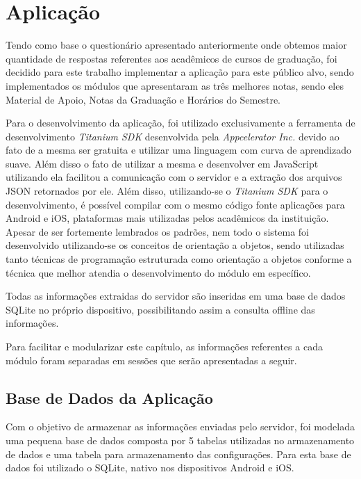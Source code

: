 \chapter{Aplicação}


Tendo como base o questionário apresentado anteriormente onde obtemos maior quantidade de respostas referentes aos acadêmicos de cursos de graduação, foi decidido para este trabalho implementar a aplicação para este público alvo, sendo implementados os módulos que apresentaram as três melhores notas, sendo eles Material de Apoio, Notas da Graduação e Horários do Semestre.

Para o desenvolvimento da aplicação, foi utilizado exclusivamente a ferramenta de desenvolvimento \emph{Titanium SDK} desenvolvida pela \emph{Appcelerator Inc.} devido ao fato de a mesma ser gratuita e utilizar uma linguagem com curva de aprendizado suave. Além disso o fato de utilizar a mesma e desenvolver em JavaScript utilizando ela facilitou a comunicação com o servidor e a extração dos arquivos JSON retornados por ele. Além disso, utilizando-se o \emph{Titanium SDK} para o desenvolvimento, é possível compilar com o mesmo código fonte aplicações para Android e iOS, plataformas mais utilizadas pelos acadêmicos da instituição. Apesar de ser fortemente lembrados os padrões, nem todo o sistema foi desenvolvido utilizando-se os conceitos de orientação a objetos, sendo utilizadas tanto técnicas de programação estruturada como orientação a objetos conforme a técnica que melhor atendia o desenvolvimento do módulo em específico.

Todas as informações extraidas do servidor são inseridas em uma base de dados SQLite no próprio dispositivo, possibilitando assim a consulta offline das informações.

Para facilitar e modularizar este capítulo, as informações referentes a cada módulo foram separadas em sessões que serão apresentadas a seguir.

\section{Base de Dados da Aplicação}

Com o objetivo de armazenar as informações enviadas pelo servidor, foi modelada uma pequena base de dados composta por 5 tabelas utilizadas no armazenamento de dados e uma tabela para armazenamento das configurações. Para esta base de dados foi utilizado o SQLite, nativo nos dispositivos Android e iOS.

